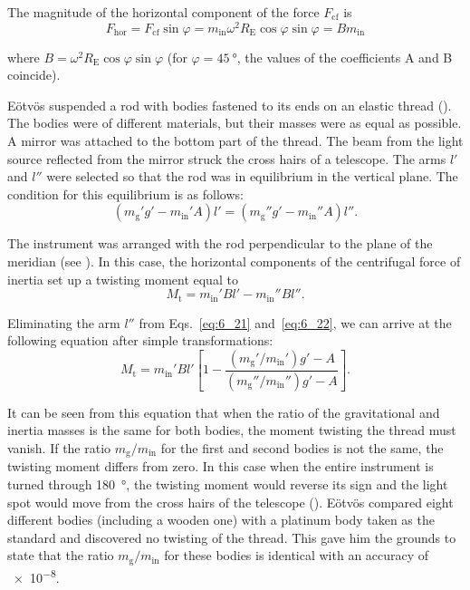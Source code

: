 The magnitude of the horizontal component of the force $F_{\text{cf}}$ is
\begin{equation*}
	F_{\text{hor}} = F_{\text{cf}}\sin\varphi =  m_{\text{in}}\omega^2R_{\text{E}}\cos\varphi\sin\varphi = Bm_{\text{in}}
\end{equation*}

\noindent
where $B=\omega^2R_{\text{E}}\cos\varphi\sin\varphi$ (for $\varphi=\SI{45}{\degree}$, the values of the coefficients A and B coincide).

E\"{o}tv\"{o}s suspended a rod with bodies fastened to its ends on an elastic thread (). The bodies were of different materials, but their masses were as equal as possible. A mirror was attached to the bottom part of the thread. The beam from the light source reflected from the mirror struck the cross hairs of a telescope. The arms $l'$ and $l''$ were selected so that the rod was in equilibrium in the vertical plane. The condition for this equilibrium is as follows:
\begin{equation}\label{eq:6_21}
	(m_{\text{g}}'g' - m_{\text{in}}'A)l' = (m_{\text{g}}''g' - m_{\text{in}}''A)l''.
\end{equation}

\noindent
The instrument was arranged with the rod perpendicular to the plane of the meridian (see ). In this case, the horizontal components of the centrifugal force of inertia set up a twisting moment equal to
\begin{equation}\label{eq:6_22}
	M_{\text{t}} = m_{\text{in}}'Bl' - m_{\text{in}}''Bl''.
\end{equation}

\noindent
Eliminating the arm $l''$ from Eqs.~\eqref{eq:6_21} and~\eqref{eq:6_22}, we can arrive at the following equation after simple transformations:
\begin{equation*}
	M_{\text{t}} = m_{\text{in}}'Bl' \left[1 - \frac{(m_{\text{g}}'/m_{\text{in}}') g' - A}{(m_{\text{g}}''/m_{\text{in}}'') g' - A} \right].
\end{equation*}

\noindent
It can be seen from this equation that when the ratio of the gravitational and inertia masses is the same for both bodies, the moment twisting the thread must vanish. If the ratio $m_{\text{g}}/m_{\text{in}}$ for the first and second bodies is not the same, the twisting moment differs from zero. In this case when the entire instrument is turned through \SI{180}{\degree}, the twisting moment would reverse its sign and the light spot would move from the cross hairs of the telescope (). E\"{o}tv\"{o}s compared eight different bodies (including a wooden one) with a platinum body taken as the standard and discovered no twisting of the thread. This gave him the grounds to state that the ratio $m_{\text{g}}/m_{\text{in}}$ for these bodies is identical with an accuracy of \num{e-8}.

